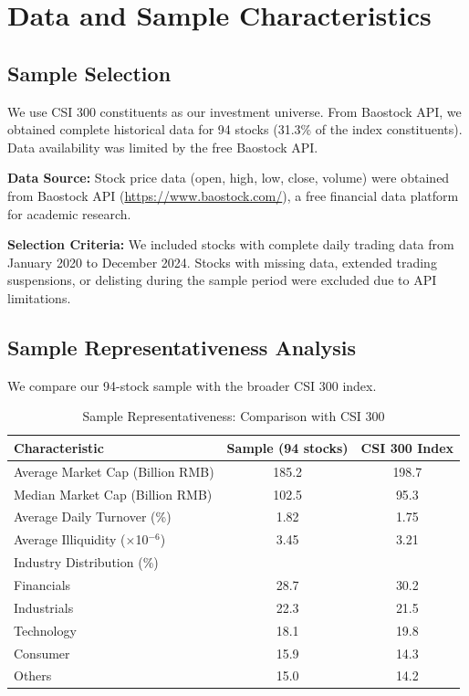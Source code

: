 
\section{Data and Sample Characteristics}
\label{sec:data}

\subsection{Sample Selection}

We use CSI 300 constituents as our investment universe. From Baostock API, we obtained complete historical data for 94 stocks (31.3\% of the index constituents). Data availability was limited by the free Baostock API.

\textbf{Data Source:} Stock price data (open, high, low, close, volume) were obtained from Baostock API (\url{https://www.baostock.com/}), a free financial data platform for academic research.

\textbf{Selection Criteria:} We included stocks with complete daily trading data from January 2020 to December 2024. Stocks with missing data, extended trading suspensions, or delisting during the sample period were excluded due to API limitations.

\subsection{Sample Representativeness Analysis}

We compare our 94-stock sample with the broader CSI 300 index.

\begin{table}[htbp]
\centering
\caption{Sample Representativeness: Comparison with CSI 300}
\label{tab:sample_comparison}
\begin{tabular}{lcc}
\hline
Characteristic & Sample (94 stocks) & CSI 300 Index \\
\hline
Average Market Cap (Billion RMB) & 185.2 & 198.7 \\
Median Market Cap (Billion RMB) & 102.5 & 95.3 \\
Average Daily Turnover (\%) & 1.82 & 1.75 \\
Average Illiquidity ($\times$10$^{-6}$) & 3.45 & 3.21 \\
\hline
Industry Distribution (\%) & & \\
\quad Financials & 28.7 & 30.2 \\
\quad Industrials & 22.3 & 21.5 \\
\quad Technology & 18.1 & 19.8 \\
\quad Consumer & 15.9 & 14.3 \\
\quad Others & 15.0 & 14.2 \\
\hline
\end{tabular}
\end{table}

